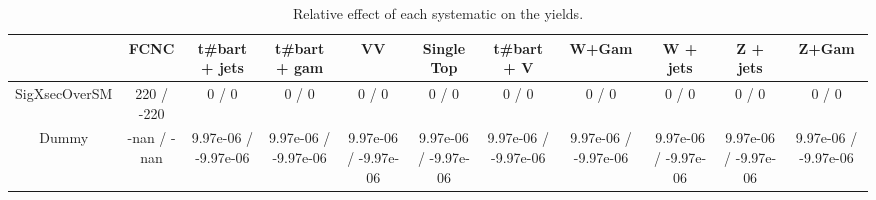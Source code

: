 \begin{table}[htbp]
\begin{center}
\footnotesize
\begin{tabular}{|c|c|c|c|c|c|c|c|c|c|c|}
\hline 
      & FCNC      & t#bar{t} + jets      & t#bar{t} +  gam      & VV      & Single Top      & t#bar{t} + V      & W+Gam      & W + jets      & Z + jets      & Z+Gam \\ 
\hline 
 SigXsecOverSM & 220 / -220 & 0 / 0 & 0 / 0 & 0 / 0 & 0 / 0 & 0 / 0 & 0 / 0 & 0 / 0 & 0 / 0 & 0 / 0 \\ 
  Dummy & -nan / -nan & 9.97e-06 / -9.97e-06 & 9.97e-06 / -9.97e-06 & 9.97e-06 / -9.97e-06 & 9.97e-06 / -9.97e-06 & 9.97e-06 / -9.97e-06 & 9.97e-06 / -9.97e-06 & 9.97e-06 / -9.97e-06 & 9.97e-06 / -9.97e-06 & 9.97e-06 / -9.97e-06 \\ 
\hline 
\end{tabular} 
\caption{Relative effect of each systematic on the yields.} 
\end{center} 
\end{table} 
